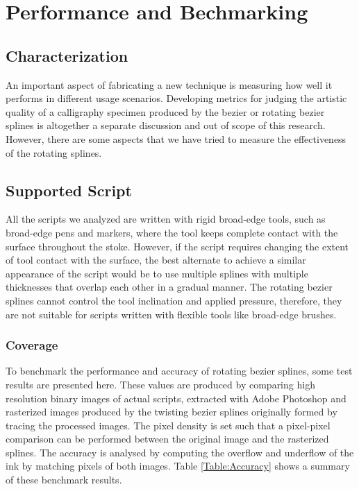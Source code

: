 \section{Performance and Bechmarking}
\label{Chapter:Performance}

\subsection{Characterization}
An important aspect of fabricating a new technique is measuring how well it performs in different usage scenarios. Developing metrics for judging the artistic quality of a calligraphy specimen produced by the bezier or rotating bezier splines is altogether a separate discussion and out of scope of this research. However, there are some aspects that we have tried to measure the effectiveness of the rotating splines.

\subsection{Supported Script}
All the scripts we analyzed are written with rigid broad-edge tools, such as broad-edge pens and markers, where the tool keeps complete contact with the surface throughout the stoke. However, if the script requires changing the extent of tool contact with the surface, the best alternate to achieve a similar appearance of the script would be to use multiple splines with multiple thicknesses that overlap each other in a gradual manner. The rotating bezier splines cannot control the tool inclination and applied pressure, therefore, they are not suitable for scripts written with flexible tools like broad-edge brushes.

\subsubsection{Coverage}
To benchmark the performance and accuracy of rotating bezier splines, some test results are presented here. These values are produced by comparing high resolution binary images of actual scripts, extracted with Adobe Photoshop and rasterized images produced by the twisting bezier splines originally formed by tracing the processed images. The pixel density is set such that a pixel-pixel comparison can be performed between the original image and the rasterized splines. The accuracy is analysed by computing the overflow and underflow of the ink by matching pixels of both images. Table \ref{Table:Accuracy} shows a summary of these benchmark results.

